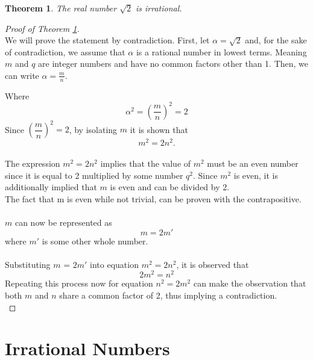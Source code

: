 \documentclass[12pt]{article}
\theoremstyle{plain}
\newtheorem{thm}{Theorem}
\theoremstyle{definition}
\begin{document}
    \begin{thm}\label{thm:main}
        The real number $\sqrt{2}$ is irrational.
    \end{thm}
    
    \begin{proof}
    [{Proof of Theorem \ref{thm:main}}]\hfill\\
    
    We will prove the statement by contradiction. First, let $\alpha=\sqrt{2}$ and, for the sake of contradiction, we assume that $\alpha$ is a rational number in lowest terms. Meaning $m$ and $q$
    are integer numbers and have no common factors other than 1.
    Then, we can write $\alpha=\frac{m}{n}$.

    Where
    $$
        \alpha^2 = \left(\dfrac{m}{n}\right)^2 = 2
    $$
    Since $\left(\dfrac{m}{n}\right)^2 = 2$, by isolating $m$ it is shown that \\
    $$
    m^2 = 2n^2.
    $$\\
    The expression $m^2 = 2n^2$ implies that the value of $m^2$ must be an even number since it is equal to 2 multiplied by some number $q^2$. Since $m^2$ is even, it is additionally implied that $m$ is even and can be divided by 2.\\
    The fact that m is even while not trivial, can be proven with the contrapositive. \cite{Chili Math}\\\\
    $m$ can now be represented as
    $$m = 2m'$$
    where $m'$ is some other whole number.\\ \\
    Substituting $m$ = $2m'$ into equation $m^2 = 2n^2$, it is observed that
    $$2m^2 = n^2$$
    Repeating this process now for equation $n^2 = 2m^2$ can make the observation that both $m$ and $n$ share a common factor of 2, thus implying a contradiction.\\

    \end{proof}

    \section{Irrational Numbers} \label{sect:irrational}
    
\end{document}
